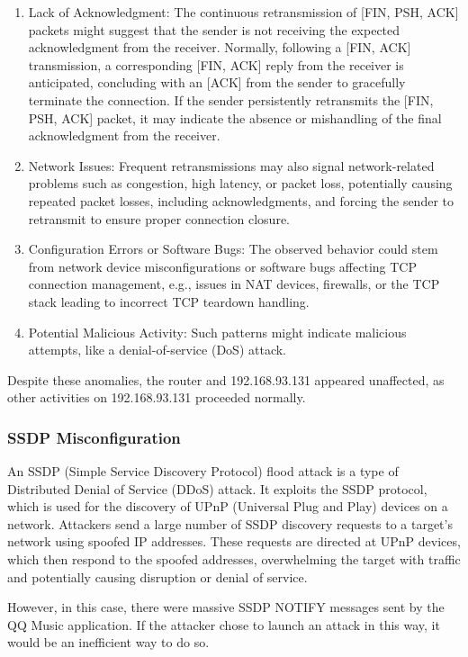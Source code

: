 \documentclass{article}
\begin{document}
    \begin{enumerate}
        \item Lack of Acknowledgment: The continuous retransmission of [FIN, PSH, ACK] packets might suggest that the sender is not receiving the expected acknowledgment from the receiver. 
        Normally, following a [FIN, ACK] transmission, a corresponding [FIN, ACK] reply from the receiver is anticipated, concluding with an [ACK] from the sender to gracefully terminate the connection. 
        If the sender persistently retransmits the [FIN, PSH, ACK] packet, it may indicate the absence or mishandling of the final acknowledgment from the receiver.
        \item Network Issues: Frequent retransmissions may also signal network-related problems such as congestion, high latency, or packet loss, potentially causing repeated packet losses, including acknowledgments, and forcing the sender to retransmit to ensure proper connection closure.
        \item Configuration Errors or Software Bugs: The observed behavior could stem from network device misconfigurations or software bugs affecting TCP connection management, e.g., issues in NAT devices, firewalls, or the TCP stack leading to incorrect TCP teardown handling.
        \item Potential Malicious Activity: Such patterns might indicate malicious attempts, like a denial-of-service (DoS) attack. 
    \end{enumerate}

    Despite these anomalies, the router and 192.168.93.131 appeared unaffected, 
    as other activities on 192.168.93.131 proceeded normally.

    \subsubsection{SSDP Misconfiguration}\label{subsubsec:ssdp-misconfiguration}
    An SSDP (Simple Service Discovery Protocol) flood attack is a type of Distributed Denial of Service (DDoS) attack. 
    It exploits the SSDP protocol, which is used for the discovery of UPnP (Universal Plug and Play) devices on a network. 
    Attackers send a large number of SSDP discovery requests to a target's network using spoofed IP addresses. 
    These requests are directed at UPnP devices, which then respond to the spoofed addresses, overwhelming the target with traffic and potentially causing disruption or denial of service.

    However, in this case, there were massive SSDP NOTIFY messages sent by the QQ Music application.
    If the attacker chose to launch an attack in this way, it would be an inefficient way to do so. 
\end{document}
